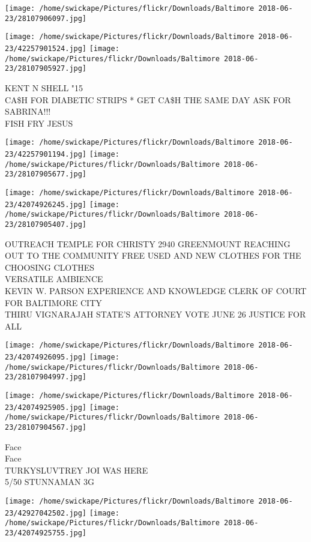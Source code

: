 \documentclass[10pt,letterpaper]{article}
\begin{document}
\texttt{[image: /home/swickape/Pictures/flickr/Downloads/Baltimore 2018-06-23/28107906097.jpg]}

\vspace{0.25in}
\texttt{[image: /home/swickape/Pictures/flickr/Downloads/Baltimore 2018-06-23/42257901524.jpg]}
\texttt{[image: /home/swickape/Pictures/flickr/Downloads/Baltimore 2018-06-23/28107905927.jpg]}

KENT N SHELL "15\\
CA\$H FOR DIABETIC STRIPS * GET CA\$H THE SAME DAY ASK FOR SABRINA!!!\\
FISH FRY JESUS\\
\pagebreak

\texttt{[image: /home/swickape/Pictures/flickr/Downloads/Baltimore 2018-06-23/42257901194.jpg]}
\texttt{[image: /home/swickape/Pictures/flickr/Downloads/Baltimore 2018-06-23/28107905677.jpg]}

\texttt{[image: /home/swickape/Pictures/flickr/Downloads/Baltimore 2018-06-23/42074926245.jpg]}
\texttt{[image: /home/swickape/Pictures/flickr/Downloads/Baltimore 2018-06-23/28107905407.jpg]}

OUTREACH TEMPLE FOR CHRISTY 2940 GREENMOUNT REACHING OUT TO THE COMMUNITY FREE USED AND NEW CLOTHES FOR THE CHOOSING CLOTHES\\
VERSATILE AMBIENCE\\
KEVIN W. PARSON EXPERIENCE AND KNOWLEDGE CLERK OF COURT FOR BALTIMORE CITY\\
THIRU VIGNARAJAH STATE'S ATTORNEY VOTE JUNE 26 JUSTICE FOR ALL\\
\pagebreak

\texttt{[image: /home/swickape/Pictures/flickr/Downloads/Baltimore 2018-06-23/42074926095.jpg]}
\texttt{[image: /home/swickape/Pictures/flickr/Downloads/Baltimore 2018-06-23/28107904997.jpg]}

\texttt{[image: /home/swickape/Pictures/flickr/Downloads/Baltimore 2018-06-23/42074925905.jpg]}
\texttt{[image: /home/swickape/Pictures/flickr/Downloads/Baltimore 2018-06-23/28107904567.jpg]}

Face\\
Face\\
TURKYSLUVTREY JOI WAS HERE\\
5/50 STUNNAMAN 3G\\
\pagebreak

\texttt{[image: /home/swickape/Pictures/flickr/Downloads/Baltimore 2018-06-23/42927042502.jpg]}
\texttt{[image: /home/swickape/Pictures/flickr/Downloads/Baltimore 2018-06-23/42074925755.jpg]}
\end{document}
